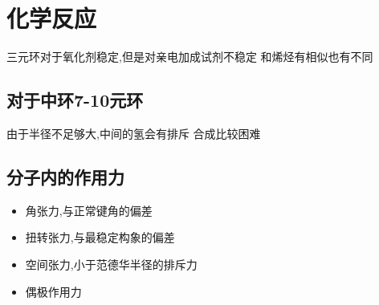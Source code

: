 \documentclass[11pt]{article}
\begin{document}
\section{化学反应}
\label{sec:orgf02cb28}
三元环对于氧化剂稳定,但是对亲电加成试剂不稳定
和烯烃有相似也有不同
\subsection{对于中环7-10元环}
\label{sec:orgc75acc1}
由于半径不足够大,中间的氢会有排斥
合成比较困难
\subsection{分子内的作用力}
\label{sec:org7467f2e}
\begin{itemize}
\item 角张力,与正常键角的偏差
\item 扭转张力,与最稳定构象的偏差
\item 空间张力,小于范德华半径的排斥力
\item 偶极作用力
\end{itemize}
\end{document}
